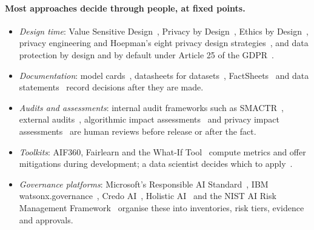 \paragraph{Most approaches decide through people, at fixed points.}
\begin{itemize}
  \item \emph{Design time}: Value Sensitive Design~\citep{friedman1996value,friedman2008value},
        Privacy by Design~\citep{cavoukian2010privacy}, Ethics by
        Design~\citep{dignum2018ethics}, privacy engineering and Hoepman's eight
        privacy design strategies~\citep{spiekermann2009engineering,hoepman2014privacy},
        and data protection by design and by default under Article 25 of the
        GDPR~\citep{eu2016gdpr,bygrave2017data}.
  \item \emph{Documentation}: model cards~\citep{mitchell2019model}, datasheets
        for datasets~\citep{gebru2021datasheets}, FactSheets~\citep{arnold2019factsheets}
        and data statements~\citep{bender2018data} record decisions after they
        are made.
  \item \emph{Audits and assessments}: internal audit frameworks such as
        SMACTR~\citep{raji2020closing}, external audits~\citep{raji2019actionable,birhane2024ai},
        algorithmic impact assessments~\citep{metcalf2021algorithmic} and
        privacy impact assessments~\citep{wright2012state} are human reviews
        before release or after the fact.
  \item \emph{Toolkits}: AIF360, Fairlearn and the What-If
        Tool~\citep{bellamy2019ai,weerts2023fairlearn,wexler2019what} compute
        metrics and offer mitigations during development; a data scientist
        decides which to apply~\citep{holstein2019improving,deng2022exploring}.
  \item \emph{Governance platforms}: Microsoft's Responsible AI
        Standard~\citep{microsoft2022responsible}, IBM
        watsonx.governance~\citep{ibm2026watsonxgov}, Credo
        AI~\citep{credoai2026platform}, Holistic AI~\citep{holisticai2026enforce}
        and the NIST AI Risk Management Framework~\citep{tabassi2023nist}
        organise these into inventories, risk tiers, evidence and approvals.
\end{itemize}

